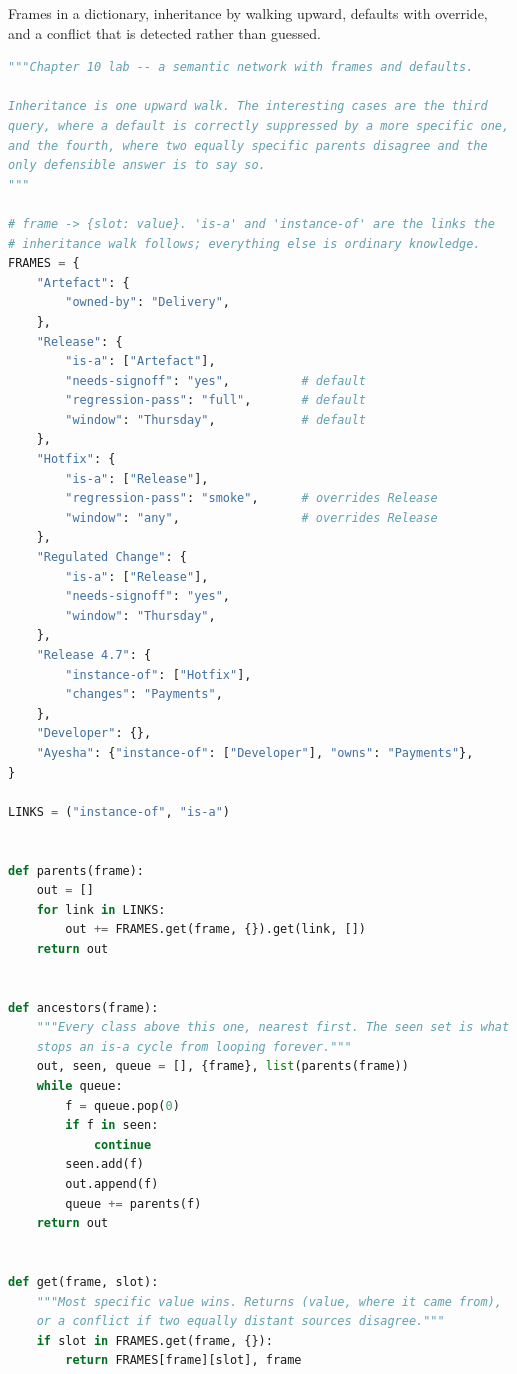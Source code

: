 \begin{lab}
Frames in a dictionary, inheritance by walking upward, defaults with override, and
a conflict that is detected rather than guessed.
\begin{lstlisting}[language=Python]
"""Chapter 10 lab -- a semantic network with frames and defaults.

Inheritance is one upward walk. The interesting cases are the third
query, where a default is correctly suppressed by a more specific one,
and the fourth, where two equally specific parents disagree and the
only defensible answer is to say so.
"""

# frame -> {slot: value}. 'is-a' and 'instance-of' are the links the
# inheritance walk follows; everything else is ordinary knowledge.
FRAMES = {
    "Artefact": {
        "owned-by": "Delivery",
    },
    "Release": {
        "is-a": ["Artefact"],
        "needs-signoff": "yes",          # default
        "regression-pass": "full",       # default
        "window": "Thursday",            # default
    },
    "Hotfix": {
        "is-a": ["Release"],
        "regression-pass": "smoke",      # overrides Release
        "window": "any",                 # overrides Release
    },
    "Regulated Change": {
        "is-a": ["Release"],
        "needs-signoff": "yes",
        "window": "Thursday",
    },
    "Release 4.7": {
        "instance-of": ["Hotfix"],
        "changes": "Payments",
    },
    "Developer": {},
    "Ayesha": {"instance-of": ["Developer"], "owns": "Payments"},
}

LINKS = ("instance-of", "is-a")


def parents(frame):
    out = []
    for link in LINKS:
        out += FRAMES.get(frame, {}).get(link, [])
    return out


def ancestors(frame):
    """Every class above this one, nearest first. The seen set is what
    stops an is-a cycle from looping forever."""
    out, seen, queue = [], {frame}, list(parents(frame))
    while queue:
        f = queue.pop(0)
        if f in seen:
            continue
        seen.add(f)
        out.append(f)
        queue += parents(f)
    return out


def get(frame, slot):
    """Most specific value wins. Returns (value, where it came from),
    or a conflict if two equally distant sources disagree."""
    if slot in FRAMES.get(frame, {}):
        return FRAMES[frame][slot], frame


\end{lstlisting}
\end{lab}
